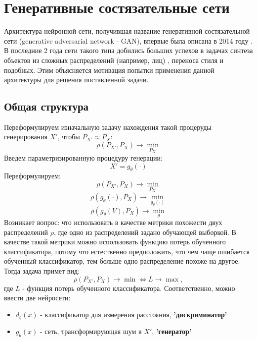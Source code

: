 \section{Генеративные состязательные сети}
	Архитектура нейронной сети, получившая название генеративной состязательной сети (generative adversarial network - GAN), впервые была описана в 2014 году \cite{GAN}. В последние 2 года сети такого типа добились больших успехов в задачах синтеза объектов из сложных распределений (например, лиц) \cite{cGAN-face}, переноса стиля \cite{algorithm-of-articsic-style} и подобных. Этим объясняется мотивация попытки применения данной архитектуры для решения поставленной задачи.
	\subsection{Общая структура}
		Переформулируем изначальную задачу нахождения такой процеруды генерирования $X'$, чтобы $ P_{X'} \approx P_X$:
		$$ \rho(P_{X'}, P_X) \longrightarrow \underset{P_{X'}}{\min} $$
		Введем параметризированную процедуру генерации:
		$$ X' = g_{\theta}(\cdot) $$
		Переформулируем:
		$$ \rho(P_{X'}, P_X) \longrightarrow \underset{P_{X'}}{\min} $$
		$$ \rho(g_{\theta}(\cdot), P_X) \longrightarrow \underset{g_{\theta}(\cdot)}{\min} $$
		$$ \rho(g_{\theta}(V), P_X) \longrightarrow \underset{\theta}{\min} $$
		Возникает вопрос: что использовать в качестве метрики похожести двух распределений $\rho$, где одно из распределений задано обучающей выборкой.
		В качестве такой метрики можно использовать функцию потерь обученного классификатора, потому что естественно предположить, что чем чаще ошибается обученный классификатор, тем больше одно распределение похоже на другое. Тогда задача примет вид:
		$$ \rho(P_{X'}, P_X) \longrightarrow \min \Leftrightarrow L \longrightarrow \max, $$
		где $L$ - функция потерь обученного классификатора.
		Соответственно, можно ввести две нейросети:
		\begin{itemize}
			\item $d_{\zeta}(x)$ - классификатор для измерения расстояния, \textbf{'дискриминатор'}
			\item $g_{\theta}(x)$ - сеть, трансформирующая шум в $X'$, \textbf{'генератор'}
		\end{itemize}
		
